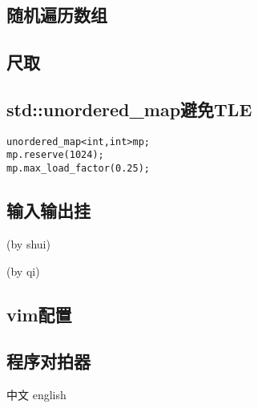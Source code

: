 \documentclass{ctexart}
\begin{document}
\subsection{随机遍历数组}

\subsection{尺取}


\subsection{std::unordered\_map避免TLE}
\begin{lstlisting}
unordered_map<int,int>mp;
mp.reserve(1024);
mp.max_load_factor(0.25);
\end{lstlisting}
\subsection{输入输出挂}
(by shui)

(by qi)

\subsection{vim配置}

\subsection{程序对拍器}





中文 english
\end{document}
